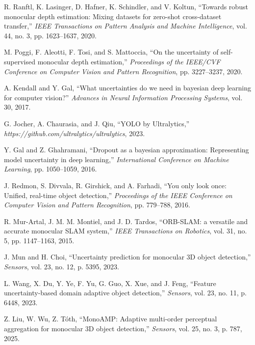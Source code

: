 \documentclass[12pt,oneside]{book}
\begin{document}
\begin{thebibliography}{99}

R. Ranftl, K. Lasinger, D. Hafner, K. Schindler, and V. Koltun,
``Towards robust monocular depth estimation: Mixing datasets for zero-shot cross-dataset transfer,''
\emph{IEEE Transactions on Pattern Analysis and Machine Intelligence}, vol. 44, no. 3, pp. 1623--1637, 2020.

M. Poggi, F. Aleotti, F. Tosi, and S. Mattoccia,
``On the uncertainty of self-supervised monocular depth estimation,''
\emph{Proceedings of the IEEE/CVF Conference on Computer Vision and Pattern Recognition}, pp. 3227--3237, 2020.

A. Kendall and Y. Gal,
``What uncertainties do we need in bayesian deep learning for computer vision?''
\emph{Advances in Neural Information Processing Systems}, vol. 30, 2017.

G. Jocher, A. Chaurasia, and J. Qiu,
``YOLO by Ultralytics,''
\emph{https://github.com/ultralytics/ultralytics}, 2023.

Y. Gal and Z. Ghahramani,
``Dropout as a bayesian approximation: Representing model uncertainty in deep learning,''
\emph{International Conference on Machine Learning}, pp. 1050--1059, 2016.

J. Redmon, S. Divvala, R. Girshick, and A. Farhadi,
``You only look once: Unified, real-time object detection,''
\emph{Proceedings of the IEEE Conference on Computer Vision and Pattern Recognition}, pp. 779--788, 2016.

R. Mur-Artal, J. M. M. Montiel, and J. D. Tardos,
``ORB-SLAM: a versatile and accurate monocular SLAM system,''
\emph{IEEE Transactions on Robotics}, vol. 31, no. 5, pp. 1147--1163, 2015.

J. Mun and H. Choi,
``Uncertainty prediction for monocular 3D object detection,''
\emph{Sensors}, vol. 23, no. 12, p. 5395, 2023.

L. Wang, X. Du, Y. Ye, F. Yu, G. Guo, X. Xue, and J. Feng,
``Feature uncertainty-based domain adaptive object detection,''
\emph{Sensors}, vol. 23, no. 11, p. 6448, 2023.

Z. Liu, W. Wu, Z. Tóth,
``MonoAMP: Adaptive multi-order perceptual aggregation for monocular 3D object detection,''
\emph{Sensors}, vol. 25, no. 3, p. 787, 2025.


\end{thebibliography}
\end{document}

